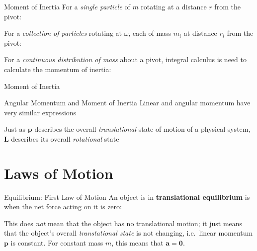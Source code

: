 \documentclass[12pt,compress,aspectratio=169]{beamer}
\begin{document}
\begin{frame}{Moment of Inertia}
  For a \emph{single particle} of $m$ rotating at a distance $r$ from the pivot:
  

  For a \emph{collection of particles} rotating at $\omega$, each of mass
  $m_i$ at distance $r_i$ from the pivot:


  For a \emph{continuous distribution of mass} about a pivot, integral calculus
  is need to calculate the momentum of inertia:

\end{frame}



\begin{frame}{Moment of Inertia}
  \centering
\end{frame}



\begin{frame}{Angular Momentum and Moment of Inertia}
  Linear and angular momentum have very similar expressions
    
  
  \vspace{-.25in}Just as $\bm{p}$ describes the overall \emph{translational}
  state of motion of a physical system, $\bm{L}$ describes its overall
  \emph{rotational} state
\end{frame}



\section{Laws of Motion}

\begin{frame}{Equilibrium: First Law of Motion}
  An object is in \textbf{translational equilibrium} is when the net force
  acting on it is zero:
  

  This does \emph{not} mean that the object has no translational motion; it
  just means that the object's overall \emph{transtational state} is not
  changing, i.e.\ linear momentum $\bm{p}$ is constant. For
  constant mass $m$, this means that $\bm{a}=\bm{0}$.
\end{frame}
\end{document}
